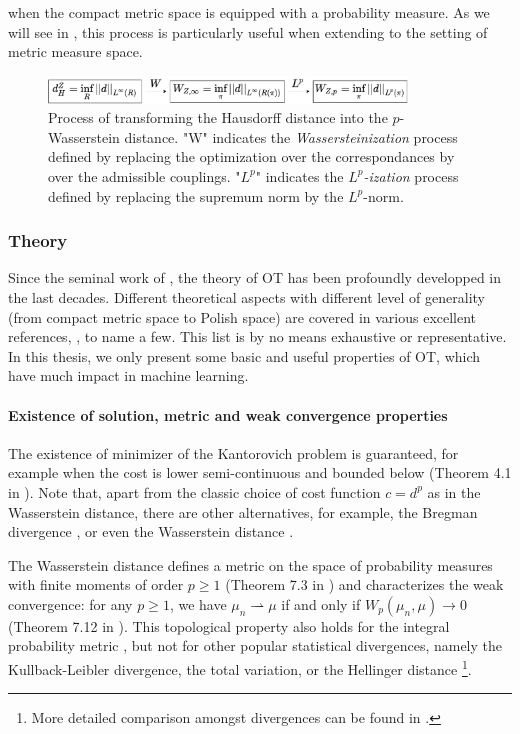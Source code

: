 when the compact metric space is equipped with a probability measure.
As we will see in , this process is particularly useful
when extending to the setting of metric measure space.
\begin{figure}[ht]
  \centering
  \includegraphics[width=0.85\textwidth,keepaspectratio]{Chapitre1/figures/wass_motiv.pdf}
  \caption[Process of transforming the Hausdorff distance into the $p$-Wasserstein distance]
  {Process of transforming the Hausdorff distance into the $p$-Wasserstein distance. "W" indicates the \textit{Wassersteinization} process defined by replacing the optimization over the correspondances by over the admissible couplings.
  "$L^p$" indicates the \textit{$L^p$-ization} process defined by replacing the supremum norm by the $L^p$-norm.}
  \label{fig:wass_motiv}
\end{figure}
\subsubsection{Theory}
Since the seminal work of \citet{Kanto42},
the theory of OT has been profoundly developped in the last decades.
Different theoretical aspects with different level of generality
(from compact metric space to Polish space) are covered in various excellent references,
\citep{Villani03,Villani08,Fillipo15,Ambrosio05}, to name a few. This list is
by no means exhaustive or representative. In this thesis, we only present some
basic and useful properties of OT, which have much impact in machine learning.

\paragraph{Existence of solution, metric and weak convergence properties}
The existence of minimizer of the Kantorovich problem is guaranteed,
for example when the cost is lower semi-continuous and bounded below
(Theorem 4.1 in \citep{Villani08}). Note that,
apart from the classic choice of cost function $c = d^p$ as in the Wasserstein distance,
there are other alternatives, for example, the Bregman divergence \citep{Guo21},
or even the Wasserstein distance \citep{Huizing22}.

The Wasserstein distance defines a metric
on the space of probability measures with finite moments of order $p \geq 1$
(Theorem 7.3 in \citep{Villani03}) and characterizes the weak convergence: for any $p \geq 1$,
we have $\mu_n \rightharpoonup \mu$ if and only if $W_p(\mu_n, \mu) \to 0$
(Theorem 7.12 in \citep{Villani03}).
This topological property also holds for the integral probability metric \citep{Muller97},
but not for other popular statistical divergences, namely the Kullback-Leibler divergence,
the total variation, or the Hellinger distance
\footnote{More detailed comparison amongst divergences can be found in \citep{Gibbs02}.}.

